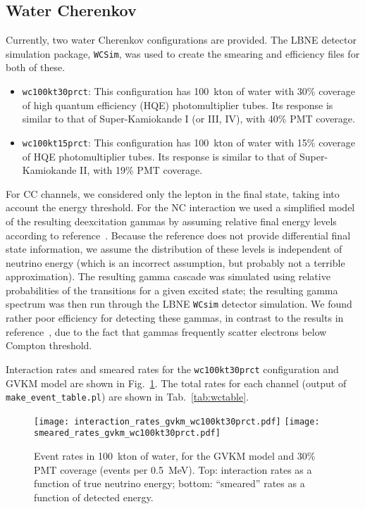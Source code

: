 \documentclass[12pt]{article}
\begin{document}
\subsection{Water Cherenkov}

Currently, two water Cherenkov configurations are provided.  The LBNE
detector simulation package, \texttt{WCSim}, was used to create the
smearing and efficiency files for both of these.

\begin{itemize}

\item \texttt{wc100kt30prct}:
This configuration has 100~kton of water with 30\% coverage of high quantum efficiency (HQE) photomultiplier tubes.  Its response is similar to that of Super-Kamiokande I (or III, IV), with 40\% PMT coverage.  

\item \texttt{wc100kt15prct}:
This configuration has 100~kton of water with 15\% coverage of HQE photomultiplier tubes.  Its response is similar to that of Super-Kamiokande II, with 19\% PMT coverage.  


\end{itemize}

For CC channels, we considered only the lepton in the final state,
taking into account the energy threshold.  For the NC interaction we
used a simplified model of the resulting deexcitation gammas by
assuming relative final energy levels according to
reference~\cite{Kolbe:2002gk}.  Because the reference does not provide
differential final state information, we assume the distribution of
these levels is independent of neutrino energy (which is an incorrect
assumption, but probably not a terrible approximation).  The resulting
gamma cascade was simulated using relative probabilities of the
transitions for a given excited state; the resulting gamma spectrum
was then run through the LBNE \texttt{WCsim} detector simulation.  We found rather poor
efficiency for detecting these gammas, in contrast to the results in
reference~\cite{Langanke:1995he}, due to the fact that gammas
frequently scatter electrons below Compton threshold.

Interaction rates and smeared rates for the \texttt{wc100kt30prct} configuration and GVKM model are shown in
Fig.~\ref{fig:wcrates}.  The total rates for each channel (output of \texttt{make\_event\_table.pl}) are shown in Tab.~\ref{tab:wctable}.

\begin{figure}[htb]
  \centering\texttt{[image: interaction\_rates\_gvkm\_wc100kt30prct.pdf]}
  \centering\texttt{[image: smeared\_rates\_gvkm\_wc100kt30prct.pdf]}

  \caption{Event rates in 100~kton of water, for the GVKM model and 30\% PMT
    coverage (events per 0.5~MeV). Top: interaction rates as a
    function of true neutrino energy; bottom:  ``smeared''
    rates as a function of detected energy.}
  \label{fig:wcrates}
\end{figure}
\end{document}
